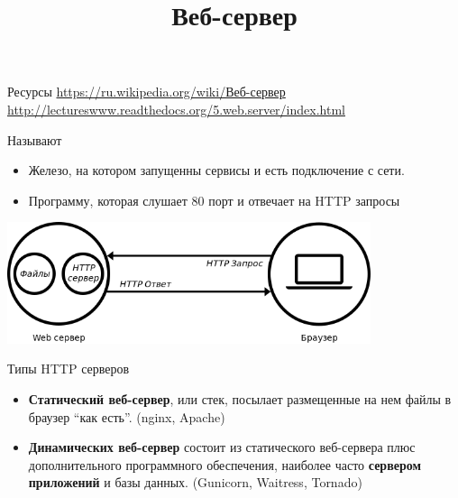 
\usepackage{array}      %

\title{Веб-сервер}



\frame{\titlepage}

\begin{frame}{Ресурсы}
    \url{https://ru.wikipedia.org/wiki/Веб-сервер}\newline
    \url{http://lectureswww.readthedocs.org/5.web.server/index.html}
\end{frame}

\begin{frame}{Называют}

    \begin{itemize}
        \item Железо, на котором запущенны сервисы и есть подключение с сети.
        \item Программу, которая слушает 80 порт и отвечает на HTTP запросы
    \end{itemize}

    \begin{center}
        \includegraphics[width=4.2in]{media/web-server.png}
    \end{center}

\end{frame}

\begin{frame}{Типы HTTP серверов}
    \begin{itemize}
        \item \textbf{Статический веб-сервер}, или стек, посылает размещенные
            на нем файлы в браузер “как есть”. (nginx, Apache)

        \item \textbf{Динамических веб-сервер} состоит из статического
            веб-сервера плюс дополнительного программного обеспечения, наиболее
            часто \textbf{сервером приложений} и базы данных.
            (Gunicorn, Waitress, Tornado)
    \end{itemize}
\end{frame}

